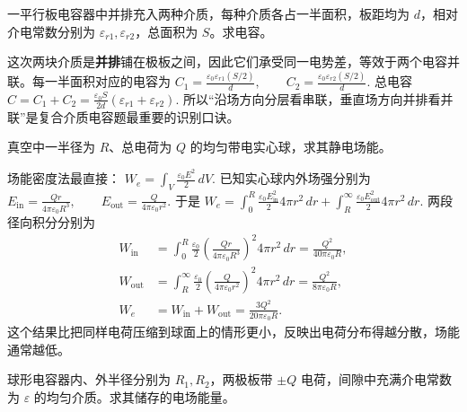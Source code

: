 \documentclass[lang=cn,11pt]{elegantbook}
\begin{document}
\begin{exercise}[并排充入两种介质的平行板电容器]
一平行板电容器中并排充入两种介质，每种介质各占一半面积，板距均为 \(d\)，相对介电常数分别为 \(\varepsilon_{r1},\varepsilon_{r2}\)，总面积为 \(S\)。求电容。
\end{exercise}

\begin{solution}
这次两块介质是\textbf{并排}铺在极板之间，因此它们承受同一电势差，等效于两个电容并联。每一半面积对应的电容为
 \(C_1=\frac{\varepsilon_0\varepsilon_{r1}(S/2)}{d}, \qquad C_2=\frac{\varepsilon_0\varepsilon_{r2}(S/2)}{d}.\) 
总电容
 \(\boxed{ C=C_1+C_2 =\frac{\varepsilon_0S}{2d}\left(\varepsilon_{r1}+\varepsilon_{r2}\right). }\) 
所以“沿场方向分层看串联，垂直场方向并排看并联”是复合介质电容题最重要的识别口诀。
\end{solution}

\begin{exercise}[均匀带电实心球的静电场能]
真空中一半径为 \(R\)、总电荷为 \(Q\) 的均匀带电实心球，求其静电场能。
\end{exercise}

\begin{solution}
场能密度法最直接：
 \(W_e=\int_V \frac{\varepsilon_0E^2}{2}\,dV.\) 
已知实心球内外场强分别为
 \(E_{\mathrm{in}}=\frac{Qr}{4\pi\varepsilon_0R^3}, \qquad E_{\mathrm{out}}=\frac{Q}{4\pi\varepsilon_0r^2}.\) 
于是
 \(W_e =\int_0^R \frac{\varepsilon_0E_{\mathrm{in}}^2}{2}4\pi r^2\,dr +\int_R^\infty \frac{\varepsilon_0E_{\mathrm{out}}^2}{2}4\pi r^2\,dr.\) 
两段径向积分分别为
\[
\begin{aligned}
W_{\mathrm{in}}
&=\int_0^R \frac{\varepsilon_0}{2}
\left(\frac{Qr}{4\pi\varepsilon_0R^3}\right)^2
4\pi r^2\,dr
=\frac{Q^2}{40\pi\varepsilon_0R},\\
W_{\mathrm{out}}
&=\int_R^\infty \frac{\varepsilon_0}{2}
\left(\frac{Q}{4\pi\varepsilon_0r^2}\right)^2
4\pi r^2\,dr
=\frac{Q^2}{8\pi\varepsilon_0R},\\
W_e&=W_{\mathrm{in}}+W_{\mathrm{out}}
=\frac{3Q^2}{20\pi\varepsilon_0R}.
\end{aligned}
\]
这个结果比把同样电荷压缩到球面上的情形更小，反映出电荷分布得越分散，场能通常越低。
\end{solution}

\begin{exercise}[球形电容器的场能]
球形电容器内、外半径分别为 \(R_1,R_2\)，两极板带 \(\pm Q\) 电荷，间隙中充满介电常数为 \(\varepsilon\) 的均匀介质。求其储存的电场能量。
\end{exercise}
\end{document}
